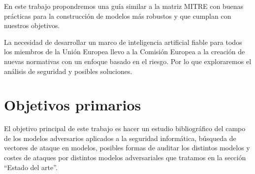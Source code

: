 En este trabajo propondremos una guía similar a la matriz \gls{MITRE} con buenas prácticas para la construcción de modelos más robustos y que cumplan con nuestros objetivos.

La necesidad de desarrollar un marco de inteligencia artificial fiable para todos los miembros de la Unión Europea llevo a la Comisión Europea a la creación de nuevas normativas con un enfoque basado en el riesgo.
Por lo que exploraremos el análisis de seguridad y posibles soluciones.


\section{Objetivos primarios}



El objetivo principal de este trabajo es hacer un estudio bibliográfico del campo de los modelos adversarios aplicados a la seguridad informática, búsqueda de vectores de ataque en modelos, posibles formas de auditar los distintos modelos y costes de ataques por distintos modelos adversariales que tratamos en la sección ``Estado del arte''.

